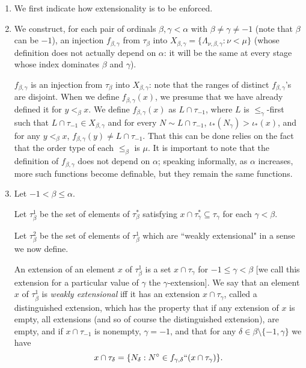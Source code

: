 \documentclass[12pt]{article}
\begin{document}
\begin{enumerate}
\item We first indicate how extensionality is to be enforced.  

\item We construct, for each pair of ordinals $\beta,\gamma<\alpha$ with $\beta \neq \gamma\neq -1$ (note that $\beta$ can be $-1$),  an injection $f_{\beta,\gamma}$ from $\tau_\beta$ into $X_{\beta,\gamma} = \{\Lambda_{\nu,\beta,\gamma}:\nu<\mu\}$  (whose definition does not actually depend on $\alpha$:  it will be the same at every stage whose index dominates $\beta$ and $\gamma$).

 $f_{\beta,\gamma}$ is an injection from $\tau_\beta$ into $X_{\beta,\gamma}$:  note that the ranges of distinct $f_{\beta,\gamma}$'s are disjoint.
When we define $f_{\beta,\gamma}(x)$, we presume that we have already defined it for $y <_\beta x$.
We define $f_{\beta,\gamma}(x)$ as $L\cap \tau_{-1}$, where $L$ is $\leq _\gamma$-first such that $L\cap \tau_{-1} \in X_{\beta,\gamma}$ and for every $N \sim L \cap \tau_{-1}$, $\iota_*(N_\gamma)>\iota_*(x)$, and for any $y<_\beta x$, $f_{\beta,\gamma}(y) \neq L\cap \tau_{-1}$.  That this can be done relies on the fact that the order type of each $\leq_\beta$ is $\mu$.  It is important to note that the definition of $f_{\beta,\gamma}$ does not depend on $\alpha$; speaking informally, as $\alpha$ increases, more such functions become definable, but they remain the same functions.

\item Let $-1<\beta\leq \alpha$.


Let $\tau_\beta^1$ be the set of elements of $\tau_\beta^*$ satisfying $x \cap \tau^*_\gamma \subseteq \tau_\gamma$ for each $\gamma<\beta$.

Let $\tau_\beta^2$ be the set of elements of $\tau_\beta^1$ which are ``weakly extensional" in a sense we now define.

 An extension of an element $x$ of $\tau_\beta^1$ is a set $x \cap \tau_\gamma$ for $-1 \leq \gamma <\beta$ [we call this extension for a particular value of $\gamma$ the $\gamma$-extension].  We say that an element $x$ of  $\tau_\beta^1$ is {\em weakly extensional\/}
iff it has an extension $x \cap \tau_\gamma$, called a distinguished extension, which has the property that if any extension of $x$ is empty, all extensions (and so of course the distinguished extension), are empty,  and if $x \cap \tau_{-1}$ is nonempty, $\gamma = -1$, and that for any $\delta \in \beta \setminus \{-1,\gamma\}$ we have $$x \cap \tau_\delta = \{N_\delta:N^\circ \in f_{\gamma,\delta}``(x \cap \tau_\gamma)\}.$$


\end{enumerate}
\end{document}
